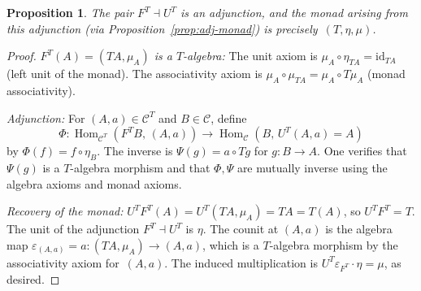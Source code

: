 \documentclass[a4paper,12pt]{book}
\DeclareMathOperator{\Hom}{Hom}
\newcommand{\id}{\mathrm{id}}
\theoremstyle{definition}
\theoremstyle{plain}
\newtheorem{proposition}[definition]{Proposition}
\theoremstyle{remark}
\begin{document}
\begin{proposition}\label{prop:em-adjunction}
The pair $F^T\dashv U^T$ is an adjunction, and the monad arising
from this adjunction (via Proposition~\ref{prop:adj-monad}) is
precisely~$(T,\eta,\mu)$.
\end{proposition}

\begin{proof}
\textit{$F^T(A) = (TA,\mu_A)$ is a $T$-algebra:}
The unit axiom is $\mu_A\circ\eta_{TA} = \id_{TA}$ (left unit of the
monad).  The associativity axiom is $\mu_A\circ\mu_{TA} = \mu_A\circ T\mu_A$
(monad associativity).

\textit{Adjunction:} For $(A,a)\in\mathcal{C}^T$ and $B\in\mathcal{C}$,
define
\[
    \Phi\colon\Hom_{\mathcal{C}^T}(F^TB,\,(A,a))
    \longrightarrow \Hom_{\mathcal{C}}(B,\,U^T(A,a) = A)
\]
by $\Phi(f) = f\circ\eta_B$.  The inverse is
$\Psi(g) = a\circ Tg$ for $g\colon B\to A$.
One verifies that $\Psi(g)$ is a $T$-algebra morphism and that
$\Phi,\Psi$ are mutually inverse using the algebra axioms and monad axioms.

\textit{Recovery of the monad:}
$U^TF^T(A) = U^T(TA,\mu_A) = TA = T(A)$, so $U^TF^T = T$.
The unit of the adjunction $F^T\dashv U^T$ is $\eta$.
The counit at $(A,a)$ is the algebra map
$\varepsilon_{(A,a)} = a\colon(T A,\mu_A)\to(A,a)$,
which is a $T$-algebra morphism by the associativity axiom for~$(A,a)$.
The induced multiplication is $U^T\varepsilon_{F^T}\cdot\eta = \mu$,
as desired.
\end{proof}
\end{document}
